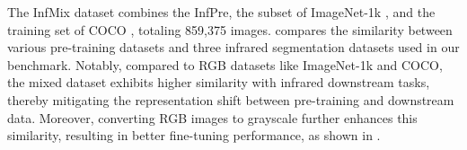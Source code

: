 The InfMix dataset combines the InfPre, the subset of ImageNet-1k \citep{imagenet}, and the training set of COCO \citep{coco}, totaling 859,375 images.  compares the similarity between various pre-training datasets and three infrared segmentation datasets used in our benchmark. Notably, compared to RGB datasets like ImageNet-1k and COCO, the mixed dataset exhibits higher similarity with infrared downstream tasks, thereby mitigating the representation shift between pre-training and downstream data. Moreover, converting RGB images to grayscale further enhances this similarity, resulting in better fine-tuning performance, as shown in .

